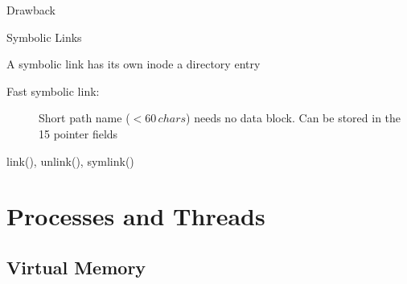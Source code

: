\begin{frame}
  \begin{block}{Drawback}
    \begin{center}
    \end{center}
  \end{block}
\end{frame}

\begin{frame}{Symbolic Links}
  \begin{block}{A symbolic link has its own inode {\pright} a directory entry}
    \begin{center}
    \end{center}
  \end{block}
  \begin{description}
  \item[Fast symbolic link:] Short path name ($< 60\,chars$) needs no data block. Can be
    stored in the 15 pointer fields
  \end{description}
\end{frame}

\begin{frame}{\ttfamily link(), unlink(), symlink()}
  \begin{center}
  \end{center}
\end{frame}

\section{Processes and Threads}
\label{sec:processes-threads}

\subsection{Virtual Memory}
\label{sec:virtual-memory}


